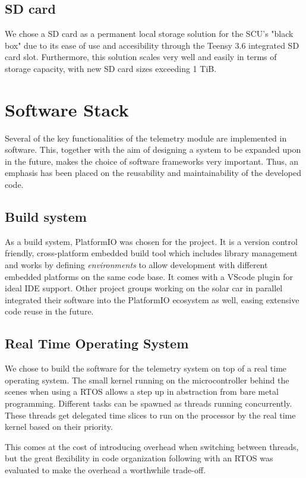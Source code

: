 \documentclass[conference]{IEEEtran}
\begin{document}
\subsection{SD card}

We chose a SD card as a permanent local storage solution for the SCU's "black box" due to its ease of use and accesibility through the Teensy 3.6 integrated SD card slot. Furthermore, this solution scales very well and easily in terms of storage capacity, with new SD card sizes exceeding 1 TiB.

\section{Software Stack}

Several of the key functionalities of the telemetry module are implemented in software. This, together with the aim of designing a system to be expanded upon in the future, makes the choice of software frameworks very important. Thus, an emphasis has been placed on the reusability and maintainability of the developed code.

\subsection{Build system}
As a build system, PlatformIO \cite{platformIO} was chosen for the project. It is a version control friendly, cross-platform embedded build tool which includes library management and works by defining \textit{environments} to allow development with different embedded platforms on the same code base. It comes with a VScode plugin for ideal IDE support. Other project groups working on the solar car in parallel integrated their software into the PlatformIO ecosystem as well, easing extensive code reuse in the future.

\subsection{Real Time Operating System}
We chose to build the software for the telemetry system on top of a real time operating system. The small kernel running on the microcontroller behind the scenes when using a RTOS allows a step up in abstraction from bare metal programming. Different tasks can be spawned as threads running concurrently. These threads get delegated time slices to run on the processor by the real time kernel based on their priority. 

This comes at the cost of introducing overhead when switching between threads, but the great flexibility in code organization following with an RTOS was evaluated to make the overhead a worthwhile trade-off.
\end{document}
